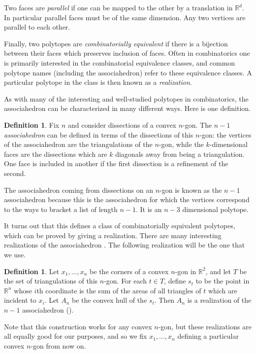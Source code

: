 \documentclass[11pt]{article}
\theoremstyle{remark}
\theoremstyle{definition}
\newtheorem{dfn}[thm]{Definition}
\begin{document}
Two faces are \emph{parallel} if one can be mapped to the other by a translation in $\mathbb{R}^d$.  In particular parallel faces must be of the same dimension. Any two vertices are parallel to each other.

Finally, two polytopes are \emph{combinatorially equivalent} if there is a bijection between their faces which preserves inclusion of faces.  Often in combinatorics one is primarily interested in the combinatorial equivalence classes, and common polytope names (including the associahedron) refer to these equivalence classes.  A particular polytope in the class is then known as a \emph{realization}.  

As with many of the interesting and well-studied polytopes in combinatorics, the associahedron can be characterized in many different ways. Here is one definition.

\begin{dfn}\label{def:associahedron} 
Fix $n$ and consider dissections of a convex $n$-gon.  The $n-1$ {\em associahedron} can be defined in terms of the dissections of this $n$-gon: the vertices of the associahedron are the triangulations of the $n$-gon, while the $k$-dimensional faces are the dissections which are $k$ diagonals away from being a triangulation.  One face is included in another if the first dissection is a refinement of the second. 
\end{dfn}

The associahedron coming from dissections on an $n$-gon is known as the $n-1$ associahedron because this is the associahedron for which the vertices correspond to the ways to bracket a list of length $n-1$.  It is an $n-3$ dimensional polytope.

It turns out that this defines a class of combinatorially equivalent polytopes, which can be proved by giving a realization. There are many interesting realizations of the associahedron {\cite{CSZinequivalent}}. The following realization will be the one that we use.  

\begin{dfn}\label{def:secondary polytope} 
  Let $x_1, \ldots, x_n$ be the corners of a convex $n$-gon in $\mathbb{R}^2$, and let $T$ be the set of triangulations of this $n$-gon.  For each $t\in T$, define $s_t$ to be the point in $\mathbb{R}^n$ whose $i$th coordinate is the sum of the areas of all triangles of $t$ which are incident to $x_i$.  Let $A_n$ be the convex hull of the $s_t$. Then $A_n$ is a realization of the $n-1$ associahedron (\cite[Example 9.11]{Ziegler}).
\end{dfn}
Note that this construction works for any convex $n$-gon, but these realizations are all equally good for our purposes, and so we fix $x_1, \ldots, x_n$ defining a particular convex $n$-gon from now on.
\end{document}
